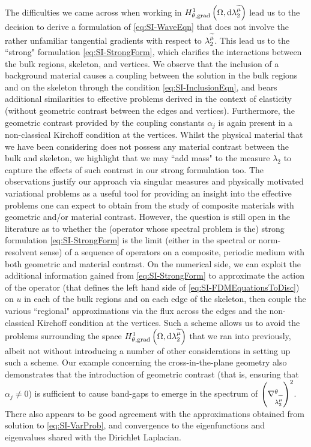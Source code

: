 The difficulties we came across when working in $H^1_{\theta, \mathrm{grad}}\left( \Omega, \mathrm{d}\lambda_2^{\widetilde{\mu}} \right)$ lead us to the decision to derive a formulation of \eqref{eq:SI-WaveEqn} that does not involve the rather unfamiliar tangential gradients with respect to $\lambda_2^{\widetilde{\mu}}$.
This lead us to the ``strong" formulation \eqref{eq:SI-StrongForm}, which clarifies the interactions between the bulk regions, skeleton, and vertices.
We observe that the inclusion of a background material causes a coupling between the solution in the bulk regions and on the skeleton through the  condition \eqref{eq:SI-InclusionEqn}, and bears additional similarities to effective problems derived in the context of elasticity (without geometric contrast between the edges and vertices).
Furthermore, the geometric contrast provided by the coupling constants $\alpha_j$ is again present in a non-classical Kirchoff condition at the vertices.
Whilst the physical material that we have been considering does not possess any material contrast between the bulk and skeleton, we highlight that we may ``add mass" to the measure $\lambda_2$ to capture the effects of such contrast in our strong formulation too.
The observations justify our approach via singular measures and physically motivated variational problems as a useful tool for providing an insight into the effective problems one can expect to obtain from the study of composite materials with geometric and/or material contrast.
However, the question is still open in the literature as to whether the (operator whose spectral problem is the) strong formulation \eqref{eq:SI-StrongForm} is the limit (either in the spectral or norm-resolvent sense) of a sequence of operators on a composite, periodic medium with both geometric and material contrast.
On the numerical side, we can exploit the additional information gained from \eqref{eq:SI-StrongForm} to approximate the action of the operator (that defines the left hand side of \eqref{eq:SI-FDMEquationsToDisc}) on $u$ in each of the bulk regions and on each edge of the skeleton, then couple the various ``regional" approximations via the flux across the edges and the non-classical Kirchoff condition at the vertices.
Such a scheme allows us to avoid the problems surrounding the space $H^1_{\theta, \mathrm{grad}}\left( \Omega, \mathrm{d}\lambda_2^{\widetilde{\mu}} \right)$ that we ran into previously, albeit not without introducing a number of other considerations in setting up such a scheme.
Our example concerning the cross-in-the-plane geometry also demonstrates that the introduction of geometric contrast (that is, ensuring that $\alpha_j\neq0$) is sufficient to cause band-gaps to emerge in the spectrum of $\left( \nabla^{\theta}_{\lambda_2^{\widetilde{\mu}}} \right)^2$. 
There also appears to be good agreement with the approximations obtained from solution to \eqref{eq:SI-VarProb}, and convergence to the eigenfunctions and eigenvalues shared with the Dirichlet Laplacian.


